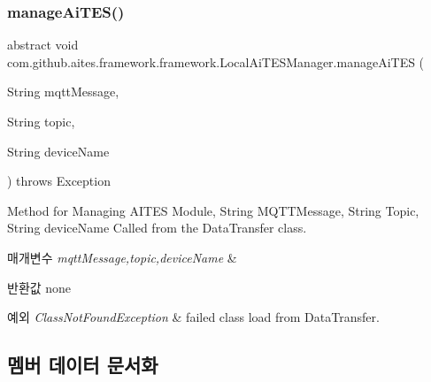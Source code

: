 \subsubsection{\texorpdfstring{manage\+Ai\+T\+E\+S()}{manageAiTES()}}
{\footnotesize\ttfamily abstract void com.\+github.\+aites.\+framework.\+framework.\+Local\+Ai\+T\+E\+S\+Manager.\+manage\+Ai\+T\+ES (\begin{DoxyParamCaption}\item[{String}]{mqtt\+Message,  }\item[{String}]{topic,  }\item[{String}]{device\+Name }\end{DoxyParamCaption}) throws Exception\hspace{0.3cm}{\ttfamily [abstract]}}



Method for Managing A\+I\+T\+ES Module, String M\+Q\+T\+T\+Message, String Topic, String device\+Name Called from the Data\+Transfer class. 


\begin{DoxyParams}{매개변수}
{\em mqtt\+Message,topic,device\+Name} & \\
\hline
\end{DoxyParams}
\begin{DoxyReturn}{반환값}
none 
\end{DoxyReturn}

\begin{DoxyExceptions}{예외}
{\em Class\+Not\+Found\+Exception} & failed class load from Data\+Transfer. \\
\hline
\end{DoxyExceptions}


\subsection{멤버 데이터 문서화}
\mbox{\label{classcom_1_1github_1_1aites_1_1framework_1_1framework_1_1_local_ai_t_e_s_manager_a150010229fa99dbac302843f2801b963}} 
